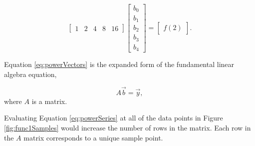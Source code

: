 \begin{equation} \label{eq:powerVectors}
\begin{bmatrix}
1 & 2 & 4 & 8 & 16
\end{bmatrix}
\begin{bmatrix}
b_0 \\
b_1 \\
b_2 \\
b_3 \\
b_4 
\end{bmatrix}
=
\begin{bmatrix}
f(2)
\end{bmatrix} .
\end{equation}

\par Equation \ref{eq:powerVectors} is the expanded form of the fundamental linear algebra equation, 

\begin{equation} \label{eq:fundLinAlg}
A\vec{b} = \vec{y},
\end{equation}
where $A$ is a matrix.

\par Evaluating Equation \ref{eq:powerSeries} at all of the data points in Figure \ref{fig:func1Samples} would increase the number of rows in the matrix. Each row in the $A$ matrix corresponds to a unique sample point.



